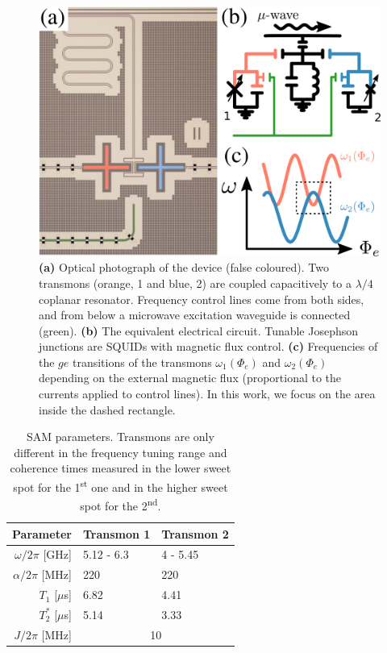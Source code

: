 \documentclass[%
 pra,
 amsmath,amssymb,
 reprint,%
]{revtex4-1}
\begin{document}
\begin{figure}
	 	\includegraphics[width=\linewidth]{experiment_2}
	\caption{\textbf{(a)} Optical photograph of the device (false coloured). Two transmons (orange, 1 and blue, 2) are coupled capacitively to a $\lambda/4$ coplanar resonator. Frequency control lines come from both sides, and from below a microwave excitation waveguide is connected (green). \textbf{(b)} The equivalent electrical circuit. Tunable Josephson junctions are SQUIDs with magnetic flux control. \textbf{(c)} Frequencies of the $ge$ transitions of the transmons $\omega_1(\Phi_e)$ and $\omega_2(\Phi_e)$ depending on the external magnetic flux (proportional to the currents applied to control lines). In this work, we focus on the area inside the dashed rectangle.}
	\label{fig:experiment}
\end{figure}


\begin{table}
	\begin{ruledtabular}
	\begin{tabular}{rll}
	Parameter & Transmon 1  & Transmon 2\\\hline
	$\omega/2\pi$ [GHz] & 5.12 - 6.3  & 4 - 5.45\\
	$\alpha/2\pi$ [MHz] & 220 & 220 \\
	$T_1$ [$\mu$s]  & 6.82 &  4.41 \\
	$T_2^*$ [$\mu$s]  & 5.14  &  3.33\\\hline
	$J/2\pi$ [MHz] &\multicolumn{2}{c}{10} 
	\end{tabular}
	\end{ruledtabular}
	\caption{SAM parameters. Transmons are only different in the frequency tuning range and coherence times measured in the lower sweet spot for the 1\textsuperscript{st} one and in the higher sweet spot for the 2\textsuperscript{nd}.}
\end{table}
\end{document}
